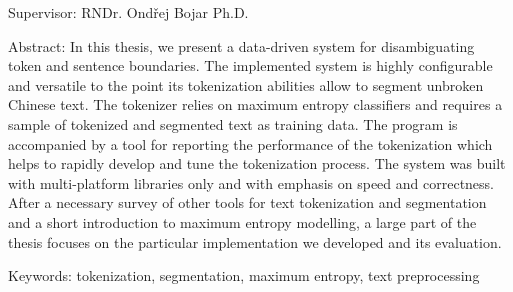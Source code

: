 {\begin{singlespace}
Supervisor:
RNDr. Ondřej Bojar Ph.D.

Abstract:
In this thesis, we present a data-driven system for disambiguating token and
sentence boundaries. The implemented system is highly configurable and
versatile to the point its tokenization abilities allow to segment unbroken
Chinese text. The tokenizer relies on maximum entropy classifiers and requires
a sample of tokenized and segmented text as training data. The program is
accompanied by a tool for reporting the performance of the tokenization which
helps to rapidly develop and tune the tokenization process. The system was
built with multi-platform libraries only and with emphasis on speed and
correctness. After a necessary survey of other tools for text tokenization and
segmentation and a short introduction to maximum entropy modelling, a large
part of the thesis focuses on the particular implementation we developed and
its evaluation.

Keywords:
tokenization, segmentation, maximum entropy, text preprocessing

\end{singlespace}

\vss}

\newpage
